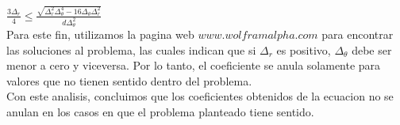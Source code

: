 \documentclass{article}
\begin{document}
$\frac{3 \Delta_r}{4}  \leq \frac{\sqrt{\Delta^2_r \Delta^4_\theta - 16 \Delta_\theta \Delta^2_r}}{d \Delta^2_\theta} $ \\
Para este fin, utilizamos la pagina web $www.wolframalpha.com$ para encontrar las soluciones al problema, las cuales indican que si $\Delta_r$ es positivo, $\Delta_\theta$ debe ser menor a cero y viceversa. Por lo tanto, el coeficiente se anula solamente para valores que no tienen sentido dentro del problema. \\
Con este analisis, concluimos que los coeficientes obtenidos de la ecuacion no se anulan en los casos en que el problema planteado tiene sentido.
\end{document}
